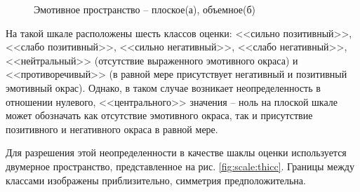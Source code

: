 \begin{figure}[H]
	\centering
	
	 \newline
	\caption{Эмотивное пространство -- плоское(а), объемное(б)}
\end{figure}

На такой шкале расположены шесть классов оценки: <<сильно позитивный>>, <<слабо позитивный>>, <<сильно негативный>>, <<слабо негативный>>, <<нейтральный>> (отсутствие выраженного эмотивного окраса) и <<противоречивый>> (в равной мере присутствует негативный и позитивный эмотивный окрас). Однако,  в таком случае возникает неопределенность в отношении нулевого, <<центрального>> значения -- ноль на плоской шкале может обозначать как отсутствие эмотивного окраса, так и присутствие позитивного и негативного окраса в равной мере.

Для разрешения этой неопределенности в качестве шаклы оценки используется двумерное пространство, представленное на рис. \ref{fig:scale:thicc}.  Границы между классами изображены приблизительно, симметрия предположительна.

